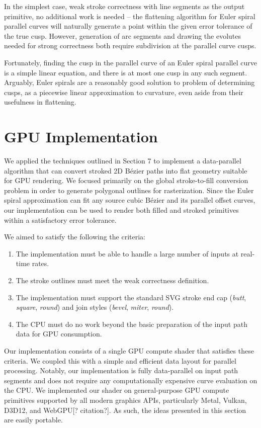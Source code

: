 \documentclass[sigconf, authordraft]{acmart}
\begin{document}
In the simplest case, weak stroke correctness with line segments as the output primitive, no additional work is needed -- the flattening algorithm for Euler spiral parallel curves will naturally generate a point within the given error tolerance of the true cusp. However, generation of arc segments and drawing the evolutes needed for strong correctness both require subdivision at the parallel curve cusps.

Fortunately, finding the cusp in the parallel curve of an Euler spiral parallel curve is a simple linear equation, and there is at most one cusp in any such segment. Arguably, Euler spirals are a reasonably good solution to problem of determining cusps, as a piecewise linear approximation to curvature, even aside from their usefulness in flattening.

\section{GPU Implementation}

We applied the techniques outlined in Section 7 to implement a data-parallel algorithm that can convert stroked 2D Bézier paths into flat geometry suitable for GPU rendering. We focused primarily on the global stroke-to-fill conversion problem in order to generate polygonal outlines for rasterization. Since the Euler spiral approximation can fit any source cubic Bézier and its parallel offset curves, our implementation can be used to render both filled and stroked primitives within a satisfactory error tolerance.

We aimed to satisfy the following the criteria:
\begin{enumerate}
  \item The implementation must be able to handle a large number of inputs at real-time rates. 
  \item The stroke outlines must meet the weak correctness definition.
  \item The implementation must support the standard SVG stroke end cap (\emph{butt}, \emph{square}, \emph{round}) and join styles (\emph{bevel}, \emph{miter}, \emph{round}).
  \item The CPU must do no work beyond the basic preparation of the input path data for GPU consumption.
\end{enumerate}

Our implementation consists of a single GPU compute shader that satisfies these criteria. We coupled this with a simple and efficient data layout for parallel processing. Notably, our implementation is fully data-parallel on input path segments and does not require any computationally expensive curve evaluation on the CPU. We implemented our shader on general-purpose GPU compute primitives supported by all modern graphics APIs, particularly Metal, Vulkan, D3D12, and WebGPU[? citation?]. As such, the ideas presented in this section are easily portable.
\end{document}

